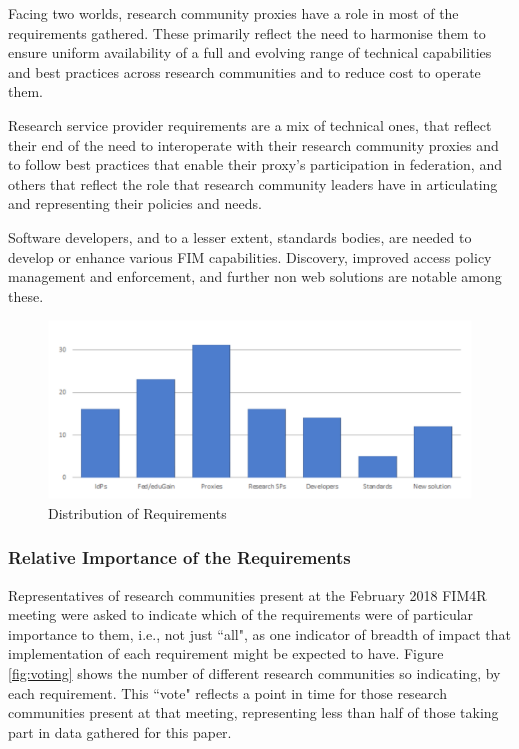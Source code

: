 \documentclass[fleqn,10pt]{wlscirep}
\begin{document}
{Facing two worlds, research community proxies have a role in most of the requirements gathered. These primarily reflect the need to harmonise them to ensure uniform availability of a full and evolving range of technical capabilities and best practices across research communities and to reduce cost to operate them.

Research service provider requirements are a mix of technical ones, that reflect their end of the need to interoperate with their research community proxies and to follow best practices that enable their proxy’s participation in federation, and others that reflect the role that research community leaders have in articulating and representing their policies and needs.

Software developers, and to a lesser extent, standards bodies, are needed to develop or enhance various FIM capabilities. Discovery, improved access policy management and enforcement, and further non web solutions are notable among these.

\begin{figure}[ht!]
  \centering
  \includegraphics[width=0.7\columnwidth]{RequirementsBreakdown.png}
  \caption{Distribution of Requirements}
  \label{fig:breakdown}
\end{figure}

\subsubsection{Relative Importance of the Requirements}

Representatives of research communities present at the February 2018 FIM4R meeting were asked to indicate which of the requirements were of particular importance to them, i.e., not just ``all", as one indicator of breadth of impact that implementation of each requirement might be expected to have. Figure \ref{fig:voting} shows the number of different research communities so indicating, by each requirement. This ``vote" reflects a point in time for those research communities present at that meeting, representing less than half of those taking part in data gathered for this paper.

}
\end{document}
